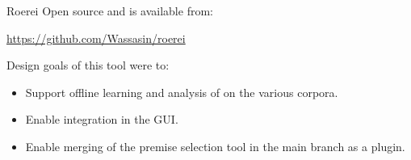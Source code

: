 \begin{frame}{Roerei}
	Open source and is available from:
	\begin{center}
		\url{https://github.com/Wassasin/roerei}
	\end{center}
	\bigskip
	Design goals of this tool were to:
	\begin{itemize}
		\item Support offline learning and analysis of \machinelearning on the various corpora.
		\item Enable integration in the \coqide GUI.
		\item Enable merging of the premise selection tool in the \coq main branch as a plugin.
    \end{itemize}
    
\end{frame}

